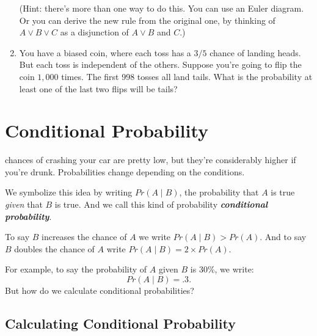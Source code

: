 \documentclass[justified]{tufte-book}
\newcommand{\given}{\mid}
\newcommand{\gt}{>}
\newcommand{\p}{Pr}
\theoremstyle{definition}
\theoremstyle{definition}
\theoremstyle{definition}
\theoremstyle{remark}
\begin{document}
\begin{enumerate}
  (Hint: there's more than one way to do this. You can use an Euler diagram. Or you can derive the new rule from the original one, by thinking of \(A \vee B \vee C\) as a disjunction of \(A \vee B\) and \(C\).)
\item
  You have a biased coin, where each toss has a \(3/5\) chance of landing heads. But each toss is independent of the others. Suppose you're going to flip the coin \(1,000\) times. The first 998 tosses all land tails. What is the probability at least one of the last two flips will be tails?
\end{enumerate}

\hypertarget{conditional-probability}{%
\chapter{Conditional Probability}\label{conditional-probability}}

 chances of crashing your car are pretty low, but they're considerably higher if you're drunk. Probabilities change depending on the conditions.

We symbolize this idea by writing \(\p(A \given B)\), the probability that \(A\) is true \emph{given} that \(B\) is true. And we call this kind of probability \textbf{\emph{conditional probability}}.

\begin{marginfigure}
To say \(B\) increases the chance of \(A\) we write
\(\p(A \given B) \gt \p(A)\). And to say \(B\) doubles the chance of
\(A\) write \(\p(A \given B) = 2 \times \p(A)\).
\end{marginfigure}

For example, to say the probability of \(A\) given \(B\) is 30\%, we write:
\[ \p(A \given B) = .3. \]
But how do we calculate conditional probabilities?

\hypertarget{calculating-conditional-probability}{%
\section{Calculating Conditional Probability}\label{calculating-conditional-probability}}
\end{document}
